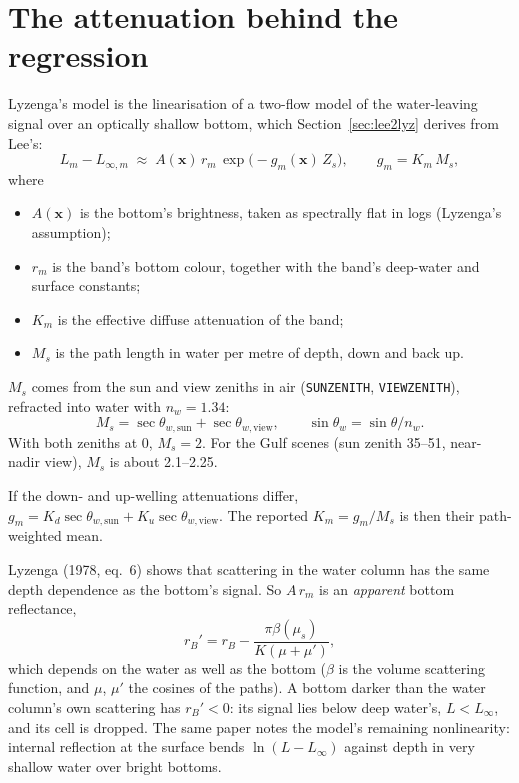\documentclass[11pt]{article}
\numberwithin{equation}{section}
\newcommand{\bx}{\mathbf{x}}
\newcommand{\code}[1]{\texttt{#1}}
\newcommand{\Lsm}[1]{L_{\infty,#1}}
\begin{document}
\section{The attenuation behind the regression}
\label{sec:physics}

Lyzenga's model is the linearisation of a two-flow model of the water-leaving signal over an
optically shallow bottom, which Section~\ref{sec:lee2lyz} derives from Lee's:
\begin{equation}
  L_m - \Lsm{m} \;\approx\; A(\bx)\, r_m\, \exp\!\bigl(-g_m(\bx)\, Z_s\bigr),
  \qquad
  g_m = K_m\, M_s ,
  \label{eq:twoflow}
\end{equation}
where
\begin{itemize}
\item $A(\bx)$ is the bottom's brightness, taken as spectrally flat in logs (Lyzenga's
  assumption);
\item $r_m$ is the band's bottom colour, together with the band's deep-water and surface
  constants;
\item $K_m$ is the effective diffuse attenuation of the band;
\item $M_s$ is the path length in water per metre of depth, down and back up.
\end{itemize}
$M_s$ comes from the sun and view zeniths in air (\code{SUNZENITH}, \code{VIEWZENITH}), refracted
into water with $n_w = 1.34$:
\begin{equation}
  M_s = \sec\theta_{w,\mathrm{sun}} + \sec\theta_{w,\mathrm{view}},
  \qquad \sin\theta_w = \sin\theta / n_w .
\end{equation}
With both zeniths at 0, $M_s = 2$. For the Gulf scenes (sun zenith 35--51\textdegree, near-nadir
view), $M_s$ is about 2.1--2.25.

If the down- and up-welling attenuations differ, $g_m = K_{d}\sec\theta_{w,\mathrm{sun}} +
K_{u}\sec\theta_{w,\mathrm{view}}$. The reported $K_m = g_m/M_s$ is then their path-weighted mean.

Lyzenga (1978, eq.~6) shows that scattering in the water column has the same depth dependence as
the bottom's signal. So $A\,r_m$ is an \emph{apparent} bottom reflectance,
\begin{equation}
  r_B' = r_B - \frac{\pi\beta(\mu_s)}{K(\mu + \mu')} ,
\end{equation}
which depends on the water as well as the bottom ($\beta$ is the volume scattering function, and
$\mu$, $\mu'$ the cosines of the paths). A bottom darker than the water column's own scattering
has $r_B' < 0$: its signal lies below deep water's, $L < L_\infty$, and its cell is dropped. The same
paper notes the model's remaining nonlinearity: internal reflection at the surface bends
$\ln(L - L_\infty)$ against depth in very shallow water over bright bottoms.
\end{document}

